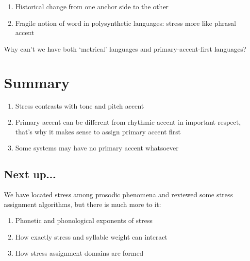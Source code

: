 \documentclass[a4paper, 12pt]{article}
\begin{document}
	\begin{enumerate}[$\gg$]
		\item Historical change from one anchor side to the other
		\item Fragile notion of word in polysynthetic languages: stress more like phrasal accent
	\end{enumerate}
	Why can't we have both `metrical' languages and primary-accent-first languages?
	
		\section{Summary}
		
	\begin{enumerate}[$\gg$]
		\item Stress contrasts with tone and pitch accent
		\item Primary accent can be different from rhythmic accent in important respect, that's why it makes sense to assign primary accent first
		\item Some systems may have no primary accent whatsoever
	\end{enumerate}
	
			\subsection{Next up...}
			
	We have located stress among prosodic phenomena and reviewed some stress assignment algorithms, but there is much more to it:
	
	\begin{enumerate}[$\gg$]
		\item Phonetic and phonological exponents of stress
		\item How exactly stress and syllable weight can interact
		\item How stress assignment domains are formed
	\end{enumerate}
		
\printbibliography
\end{document}
